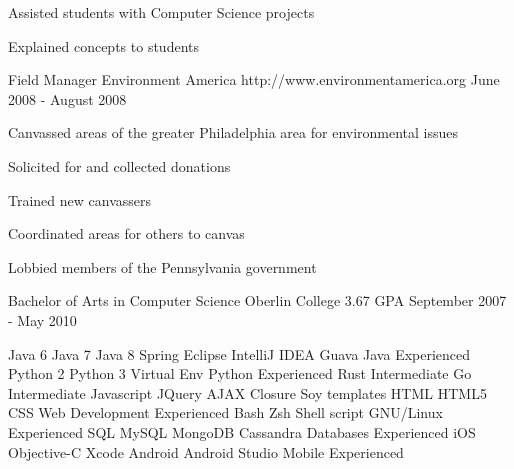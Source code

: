 \documentclass[11pt, a4paper]{awesome-cv}
\begin{document}
\begin{cventries}
{\begin{cvitems}
        \item {Assisted students with Computer Science projects}\item {Explained concepts to students}
      \end{cvitems}
    }
    \cventry
    {Field Manager}
    {Environment America}
    {http://www.environmentamerica.org}
    {June 2008 - August 2008}
    {
      \begin{cvitems}
        \item {Canvassed areas of the greater Philadelphia area for environmental issues}\item {Solicited for and collected donations}\item {Trained new canvassers}\item {Coordinated areas for others to canvas}\item {Lobbied members of the Pennsylvania government}
      \end{cvitems}
    }
  
\end{cventries}

\begin{cventries}
    \cventry
    {Bachelor of Arts in Computer Science}
    {Oberlin College}
    {3.67 GPA}
    {September 2007 - May 2010}
    {} %
  
\end{cventries}

\begin{cventries}
    \cventry
    {Java 6 \quad Java 7 \quad Java 8 \quad Spring \quad Eclipse \quad IntelliJ IDEA \quad Guava \quad }
    {Java}
    {Experienced}
    {} %
    {} %
    \cventry
    {Python 2 \quad Python 3 \quad Virtual Env \quad }
    {Python}
    {Experienced}
    {} %
    {} %
    \cventry
    {}
    {Rust}
    {Intermediate}
    {} %
    {} %
    \cventry
    {}
    {Go}
    {Intermediate}
    {} %
    {} %
    \cventry
    {Javascript \quad JQuery \quad AJAX \quad Closure \quad Soy templates \quad HTML \quad HTML5 \quad CSS \quad }
    {Web Development}
    {Experienced}
    {} %
    {} %
    \cventry
    {Bash \quad Zsh \quad Shell script \quad }
    {GNU/Linux}
    {Experienced}
    {} %
    {} %
    \cventry
    {SQL \quad MySQL \quad MongoDB \quad Cassandra \quad }
    {Databases}
    {Experienced}
    {} %
    {} %
    \cventry
    {iOS \quad Objective-C \quad Xcode \quad Android \quad Android Studio \quad }
    {Mobile}
    {Experienced}
    {} %
    {} %
  
\end{cventries}
\end{document}
